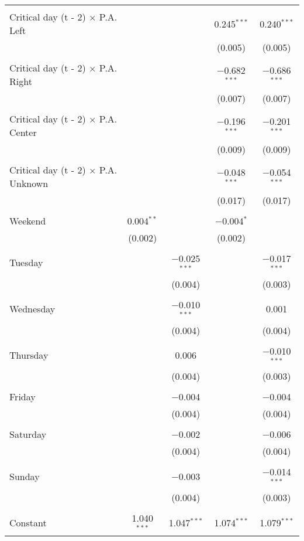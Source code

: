 \documentclass[
]{article}
\begin{document}
\begin{table}[!htbp]
{\begin{tabular}{@{\extracolsep{5pt}}lcccc}
  & & & & \\ 
 Critical day (t - 2) $\times$ P.A. Left &  &  & 0.245$^{***}$ & 0.240$^{***}$ \\ 
  &  &  & (0.005) & (0.005) \\ 
  & & & & \\ 
 Critical day (t - 2) $\times$ P.A. Right &  &  & $-$0.682$^{***}$ & $-$0.686$^{***}$ \\ 
  &  &  & (0.007) & (0.007) \\ 
  & & & & \\ 
 Critical day (t - 2) $\times$ P.A. Center &  &  & $-$0.196$^{***}$ & $-$0.201$^{***}$ \\ 
  &  &  & (0.009) & (0.009) \\ 
  & & & & \\ 
 Critical day (t - 2) $\times$ P.A. Unknown &  &  & $-$0.048$^{***}$ & $-$0.054$^{***}$ \\ 
  &  &  & (0.017) & (0.017) \\ 
  & & & & \\ 
 Weekend & 0.004$^{**}$ &  & $-$0.004$^{*}$ &  \\ 
  & (0.002) &  & (0.002) &  \\ 
  & & & & \\ 
 Tuesday &  & $-$0.025$^{***}$ &  & $-$0.017$^{***}$ \\ 
  &  & (0.004) &  & (0.003) \\ 
  & & & & \\ 
 Wednesday &  & $-$0.010$^{***}$ &  & 0.001 \\ 
  &  & (0.004) &  & (0.004) \\ 
  & & & & \\ 
 Thursday &  & 0.006 &  & $-$0.010$^{***}$ \\ 
  &  & (0.004) &  & (0.003) \\ 
  & & & & \\ 
 Friday &  & $-$0.004 &  & $-$0.004 \\ 
  &  & (0.004) &  & (0.004) \\ 
  & & & & \\ 
 Saturday &  & $-$0.002 &  & $-$0.006 \\ 
  &  & (0.004) &  & (0.004) \\ 
  & & & & \\ 
 Sunday &  & $-$0.003 &  & $-$0.014$^{***}$ \\ 
  &  & (0.004) &  & (0.003) \\ 
  & & & & \\ 
 Constant & 1.040$^{***}$ & 1.047$^{***}$ & 1.074$^{***}$ & 1.079$^{***}$ \\ 

\end{tabular}}
\end{table}
\end{document}

